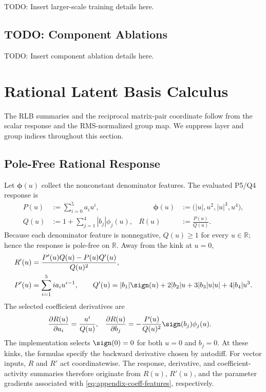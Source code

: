 \documentclass{article}
\begin{document}
TODO: Insert larger-scale training details here.

\subsection{TODO: Component Ablations}
\label{app:todo-ablations}

TODO: Insert component ablation details here.


\section{Rational Latent Basis Calculus}
\label{app:rlb-calculus}

The RLB summaries and the reciprocal matrix-pair coordinate follow from the
scalar response and the RMS-normalized group map.  We suppress layer and group
indices throughout this section.

\subsection{Pole-Free Rational Response}
\label{app:rlb-response-derivatives}

Let $\boldsymbol\phi(u)$ collect the nonconstant denominator features.  The
evaluated P5/Q4 response is
\begin{equation}
\begin{alignedat}{2}
    P(u)
    &:=\sum_{i=0}^{5}a_i u^i,
    &\qquad
    \boldsymbol\phi(u)
    &:=\bigl(|u|,u^2,|u|^3,u^4\bigr),
    \\
    Q(u)
    &:=1+\sum_{j=1}^{4}|b_j|\phi_j(u),
    &
    R(u)
    &:=\frac{P(u)}{Q(u)}.
\end{alignedat}
    \label{eq:appendix-local-pq}
\end{equation}
Because each denominator feature is nonnegative, $Q(u)\ge1$ for every
$u\in\mathbb R$; hence the response is pole-free on $\mathbb R$.  Away from the kink at
$u=0$,
\begin{equation}
\begin{aligned}
    R'(u)
    &=\frac{P'(u)Q(u)-P(u)Q'(u)}{Q(u)^2},
    \\
    P'(u)
    &=\sum_{i=1}^{5} i a_i u^{i-1},
    \qquad
    Q'(u)
    =|b_1|\sign(u)+2|b_2|u+3|b_3|u|u|+4|b_4|u^3.
\end{aligned}
    \label{eq:appendix-r-prime}
\end{equation}
The selected coefficient derivatives are
\begin{equation}
\begin{aligned}
    \frac{\partial R(u)}{\partial a_i}
    &=\frac{u^i}{Q(u)},
    &
    \frac{\partial R(u)}{\partial b_j}
    &=-\frac{P(u)}{Q(u)^2}\sign(b_j)\phi_j(u).
\end{aligned}
    \label{eq:appendix-coeff-features}
\end{equation}
The implementation selects $\sign(0)=0$ for both $u=0$ and $b_j=0$.  At these
kinks, the formulas specify the backward derivative chosen by autodiff.  For
vector inputs, $R$ and $R'$ act coordinatewise.  The response, derivative, and
coefficient-activity summaries therefore originate from $R(u)$, $R'(u)$, and
the parameter gradients associated with
\eqref{eq:appendix-coeff-features}, respectively.
\end{document}
